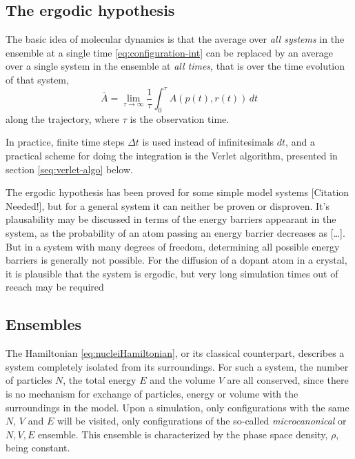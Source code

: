 \documentclass[11pt,bibliography=totoc,index=totoc]{scrbook}   %
\begin{document}
\subsection{The ergodic hypothesis}

The basic idea of molecular dynamics is that the average over \emph{all systems} in the ensemble at a single time \eqref{eq:configuration-int} can be replaced by an average over a single system in the ensemble at \emph{all times}, that is over the time evolution of that system,
\begin{equation}
  \bar{A} = \lim_{\tau\to\infty} \frac{1}{\tau}\int_{0}^{\tau} A(p(t),r(t)) \,dt
  \label{eq:time-integral}
\end{equation}
along the trajectory, where $\tau$ is the observation time. 

In practice, finite time steps $\Delta t$ is used instead of infinitesimals $dt$, and a practical scheme for doing
the integration is the Verlet algorithm, presented in section \ref{seq:verlet-algo} below.

The ergodic hypothesis has been proved for some simple model systems [Citation Needed!], 
but for a general system it can neither be proven or disproven. 
It's plausability may be discussed in terms of the energy barriers appearant in the system,
as the probability of an atom passing an energy barrier decreases as [\ldots]. 
But in a system with many degrees of freedom, determining all possible energy barriers is generally not possible.
For the diffusion of a dopant atom in a crystal, it is plausible that the system is ergodic, but very long
simulation times out of reeach may be required


\subsection{Ensembles}

The Hamiltonian \eqref{eq:nucleiHamiltonian}, or its classical counterpart, describes a system completely isolated from its surroundings.
For such a system, the number of particles $N$, the total energy $E$ and the volume $V$ are all conserved, since there is no mechanism for exchange of particles, energy or volume with the surroundings in the model.
Upon a simulation, only configurations with the same $N$, $V$ and $E$ will be visited, only configurations of the so-called \emph{microcanonical} or $N,V,E$ ensemble. This ensemble is characterized by the phase space density, $\rho$, being constant.
\end{document}
